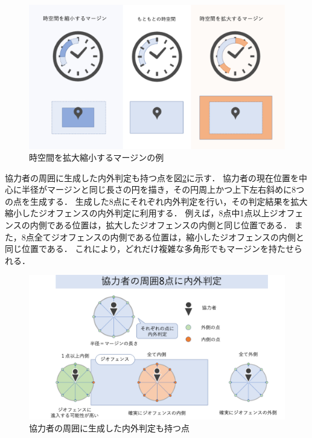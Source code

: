 \begin{figure}[tbh]
    \centering
    \includegraphics[width=16cm]{img_margin_1.png}
    \caption{時空間を拡大縮小するマージンの例}
    \label{fig:margin_1}
\end{figure}

協力者の周囲に生成した内外判定も持つ点を図\ref{fig:margin_2.1}に示す．
協力者の現在位置を中心に半径がマージンと同じ長さの円を描き，その円周上かつ上下左右斜めに8つの点を生成する．
生成した8点にそれぞれ内外判定を行い，その判定結果を拡大縮小したジオフェンスの内外判定に利用する．
例えば，8点中1点以上ジオフェンスの内側である位置は，拡大したジオフェンスの内側と同じ位置である．
また，8点全てジオフェンスの内側である位置は，縮小したジオフェンスの内側と同じ位置である．
これにより，どれだけ複雑な多角形でもマージンを持たせられる．

\begin{figure}[tbh]
    \centering
    \includegraphics[width=16cm]{img_margin_2.1.png}
    \caption{協力者の周囲に生成した内外判定も持つ点}
    \label{fig:margin_2.1}
\end{figure}

